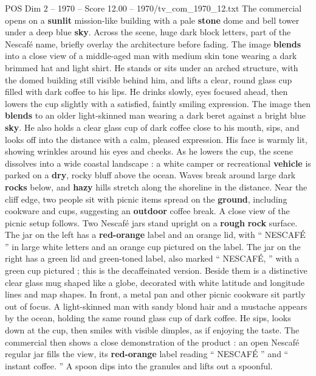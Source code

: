 \begin{textsample}{POS Dim 2 – 1970 – Score 12.00 – 1970/tv\_com\_1970\_12.txt}  \label{ex:f2_pos_078}
The commercial opens on a \textbf{sunlit} mission-like building with a pale \textbf{stone} dome and bell tower under a deep blue \textbf{sky}.
Across the scene, huge dark block letters, part of the Nescafé name, briefly overlay the architecture before fading.
The image \textbf{blends} into a close view of a middle-aged man with medium skin tone wearing a dark brimmed hat and light shirt.
He stands or sits under an arched structure, with the domed building still visible behind him, and lifts a clear, round glass cup filled with dark coffee to his lips.
He drinks slowly, eyes focused ahead, then lowers the cup slightly with a satisfied, faintly smiling expression.
The image then \textbf{blends} to an older light-skinned man wearing a dark beret against a bright blue \textbf{sky}.
He also holds a clear glass cup of dark coffee close to his mouth, sips, and looks off into the distance with a calm, pleased expression.
His face is warmly lit, showing wrinkles around his eyes and cheeks.
As he lowers the cup, the scene dissolves into a wide coastal landscape : a white camper or recreational \textbf{vehicle} is parked on a \textbf{dry}, rocky bluff above the ocean.
Waves break around large dark \textbf{rocks} below, and \textbf{hazy} hills stretch along the shoreline in the distance.
Near the cliff edge, two people sit with picnic items spread on the \textbf{ground}, including cookware and cups, suggesting an \textbf{outdoor} coffee break.
A close view of the picnic setup follows.
Two Nescafé jars stand upright on a \textbf{rough} \textbf{rock} surface.
The jar on the left has a \textbf{red-orange} label and an orange lid, with “ NESCAFÉ ” in large white letters and an orange cup pictured on the label.
The jar on the right has a green lid and green-toned label, also marked “ NESCAFÉ, ” with a green cup pictured ; this is the decaffeinated version.
Beside them is a distinctive clear glass mug shaped like a globe, decorated with white latitude and longitude lines and map shapes.
In front, a metal pan and other picnic cookware sit partly out of focus.
A light-skinned man with sandy blond hair and a mustache appears by the ocean, holding the same round glass cup of dark coffee.
He sips, looks down at the cup, then smiles with visible dimples, as if enjoying the taste.
The commercial then shows a close demonstration of the product : an open Nescafé regular jar fills the view, its \textbf{red-orange} label reading “ NESCAFÉ ” and “ instant coffee. ” A spoon dips into the granules and lifts out a spoonful.

\end{textsample}
